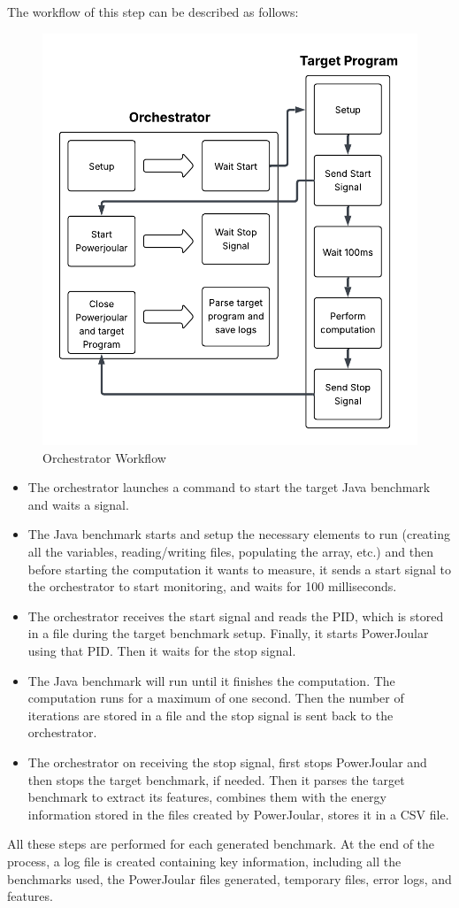 The workflow of this step can be described as follows:


\begin{figure}[htbp]
  \centering
  \includegraphics[scale = 0.7]{figures/orchestrators_process.pdf}
  \caption{Orchestrator Workflow}
  \label{fig:orchestrators_workflow}
\end{figure}

\begin{itemize}
  \item The orchestrator launches a command to start the target Java benchmark and waits a signal.
  \item The Java benchmark starts and setup the necessary elements to run (creating all the variables, reading/writing files, populating the array, etc.) and then before starting the computation it wants to measure, it sends a start signal to the orchestrator to start monitoring, and waits for 100 milliseconds.
  \item The orchestrator receives the start signal and reads the PID, which is stored in a file during the target benchmark setup. Finally, it starts PowerJoular using that PID. Then it waits for the stop signal.
  \item The Java benchmark will run until it finishes the computation. The computation runs for a maximum of one second. Then the number of iterations are stored in a file and the stop signal is sent back to the orchestrator.
  \item The orchestrator on receiving the stop signal, first stops PowerJoular and then stops the target benchmark, if needed. Then it parses the target benchmark to extract its features, combines them with the energy information stored in the files created by PowerJoular, stores it in a CSV file.
\end{itemize}

All these steps are performed for each generated benchmark. At the end of the process, a log file is created containing key information, including all the benchmarks used, the PowerJoular files generated, temporary files, error logs, and features.
